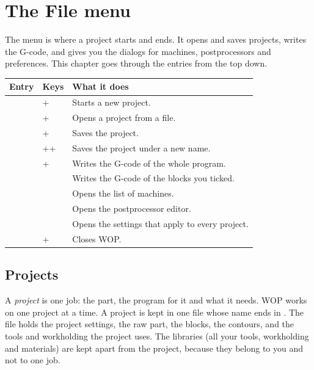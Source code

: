 \chapter{The File menu}\label{ch:file}

The  menu is where a project starts and ends. It opens and saves projects, writes the G-code, and gives you the dialogs for machines, postprocessors and preferences. This chapter goes through the entries from the top down.


\begin{center}
\begin{tabularx}{\textwidth}{@{}l l Y@{}}
\toprule
\textbf{Entry} & \textbf{Keys} & \textbf{What it does} \\
\midrule
{} & + & Starts a new project. \\
 & + & Opens a project from a file. \\
 & + & Saves the project. \\
 & ++ & Saves the project under a new name. \\
 & + & Writes the G-code of the whole program. \\
 & & Writes the G-code of the blocks you ticked. \\
 & & Opens the list of machines. \\
 & & Opens the postprocessor editor. \\
 & & Opens the settings that apply to every project. \\
 & + & Closes WOP. \\
\bottomrule
\end{tabularx}
\end{center}

\section{Projects}\label{sec:file:projects}

A \emph{project} is one job: the part, the program for it and what it needs. WOP works on one project at a time. A project is kept in one file whose name ends in . The file holds the project settings, the raw part, the blocks, the contours, and the tools and workholding the project uses. The libraries (all your tools, workholding and materials) are kept apart from the project, because they belong to you and not to one job.

